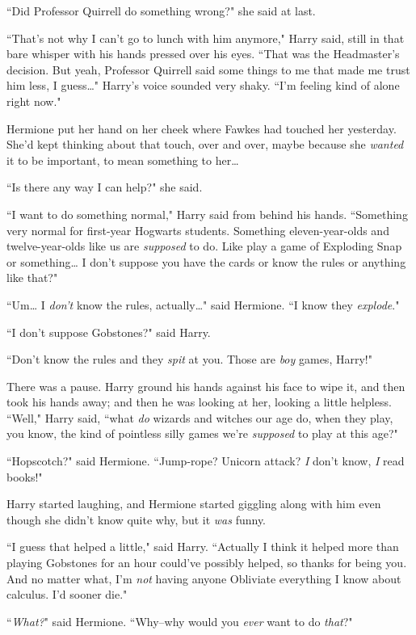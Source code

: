 ``Did Professor Quirrell do something wrong?" she said at last.

``That's not why I can't go to lunch with him anymore," Harry said, still in that bare whisper with his hands pressed over his eyes. ``That was the Headmaster's decision. But yeah, Professor Quirrell said some things to me that made me trust him less, I guess{\ldots}" Harry's voice sounded very shaky. ``I'm feeling kind of alone right now."

Hermione put her hand on her cheek where Fawkes had touched her yesterday. She'd kept thinking about that touch, over and over, maybe because she \emph{wanted} it to be important, to mean something to her{\ldots}

``Is there any way I can help?" she said.

``I want to do something normal," Harry said from behind his hands. ``Something very normal for first-year Hogwarts students. Something eleven-year-olds and twelve-year-olds like us are \emph{supposed} to do. Like play a game of Exploding Snap or something{\ldots} I don't suppose you have the cards or know the rules or anything like that?"

``Um{\ldots} I \emph{don't} know the rules, actually{\ldots}" said Hermione. ``I know they \emph{explode}."

``I don't suppose Gobstones?" said Harry.

``Don't know the rules and they \emph{spit} at you. Those are \emph{boy} games, Harry!"

There was a pause. Harry ground his hands against his face to wipe it, and then took his hands away; and then he was looking at her, looking a little helpless. ``Well," Harry said, ``what \emph{do} wizards and witches our age do, when they play, you know, the kind of pointless silly games we're \emph{supposed} to play at this age?"

``Hopscotch?" said Hermione. ``Jump-rope? Unicorn attack? \emph{I} don't know, \emph{I} read books!"

Harry started laughing, and Hermione started giggling along with him even though she didn't know quite why, but it \emph{was} funny.

``I guess that helped a little," said Harry. ``Actually I think it helped more than playing Gobstones for an hour could've possibly helped, so thanks for being you. And no matter what, I'm \emph{not} having anyone Obliviate everything I know about calculus. I'd sooner die."

``\emph{What?}" said Hermione. ``Why\---why would you \emph{ever} want to do \emph{that}?"


